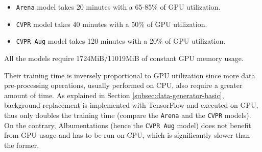 \begin{itemize}
    \item \texttt{Arena} model takes 20 minutes with a 65-85\% of GPU utilization.
    \item \texttt{CVPR} model takes 40 minutes with a 50\% of GPU utilization.
    \item \texttt{CVPR Aug} model takes 120 minutes with a 20\% of GPU utilization.
\end{itemize}

All the models require 1724MiB/11019MiB of constant GPU memory usage.

Their training time is inversely proportional to GPU utilization since more data pre-processing operations, usually performed on CPU, also require a greater amount of time. As explained in Section \ref{subsec:data-generator-basic}, background replacement is implemented with TensorFlow and executed on GPU, thus only doubles the training time (compare the \texttt{Arena} and the \texttt{CVPR} models). On the contrary, Albumentations (hence the \texttt{CVPR Aug} model) does not benefit from GPU usage and has to be run on CPU, which is significantly slower than the former.



